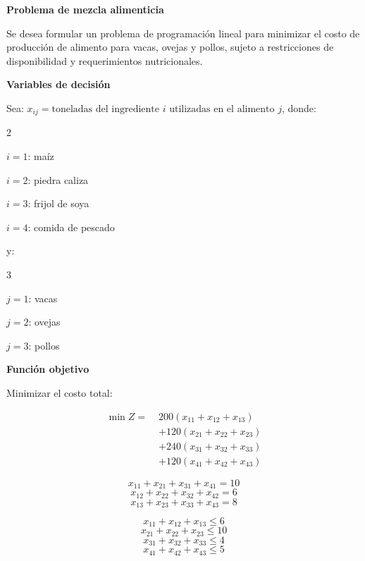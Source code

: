 \begin{Ejem}

\textbf{Problema de mezcla alimenticia}

Se desea formular un problema de programaci\'on lineal para minimizar el costo de producci\'on de alimento para vacas, ovejas y pollos, sujeto a restricciones de disponibilidad y requerimientos nutricionales.

\textbf{Variables de decisi\'on}

Sea: $x_{ij} = \text{toneladas del ingrediente } i \text{ utilizadas en el alimento } j$, donde:
\begin{itemize}
\begin{multicols}{2}
    \item $i=1$: ma\'iz
    \item $i=2$: piedra caliza
    \item $i=3$: frijol de soya
    \item $i=4$: comida de pescado
\end{multicols}    
\end{itemize}

y:
\begin{itemize}
\begin{multicols}{3}
    \item $j=1$: vacas
    \item $j=2$: ovejas
    \item $j=3$: pollos
\end{multicols}
\end{itemize}

\textbf{Funci\'on objetivo}

Minimizar el costo total:
\begin{tcolorbox}[title=Minimizar el costo total]
\[
\begin{aligned}
\min Z =\;& 200(x_{11}+x_{12}+x_{13}) \\
&+120(x_{21}+x_{22}+x_{23}) \\
&+240(x_{31}+x_{32}+x_{33}) \\
&+120(x_{41}+x_{42}+x_{43})
\end{aligned}
\]
\end{tcolorbox}
\medskip

\begin{tcolorbox}[title=Restricciones de producci\'on]
\[
x_{11}+x_{21}+x_{31}+x_{41} = 10
\]
\[
x_{12}+x_{22}+x_{32}+x_{42} = 6
\]
\[
x_{13}+x_{23}+x_{33}+x_{43} = 8
\]
\end{tcolorbox}
\medskip

\begin{tcolorbox}[title=Restricciones de disponibilidad]
\[
x_{11}+x_{12}+x_{13} \leq 6
\]
\[
x_{21}+x_{22}+x_{23} \leq 10
\]
\[
x_{31}+x_{32}+x_{33} \leq 4
\]
\[
x_{41}+x_{42}+x_{43} \leq 5
\]
\end{tcolorbox}



\end{Ejem}
